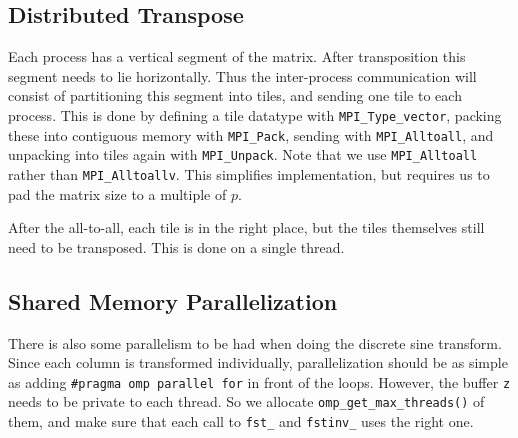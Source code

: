 \documentclass[a4paper, 12pt]{article}
\begin{document}
    \subsection{Distributed Transpose}
    Each process has a vertical segment of the matrix. After transposition this segment needs to lie horizontally. Thus the inter-process communication will consist of partitioning this segment into tiles, and sending one tile to each process. This is done by defining a tile datatype with \texttt{MPI\_Type\_vector}, packing these into contiguous memory with \texttt{MPI\_Pack}, sending with \texttt{MPI\_Alltoall}, and unpacking into tiles again with \texttt{MPI\_Unpack}. Note that we use \texttt{MPI\_Alltoall} rather than \texttt{MPI\_Alltoallv}. This simplifies implementation, but requires us to pad the matrix size to a multiple of $p$.
    
    After the all-to-all, each tile is in the right place, but the tiles themselves still need to be transposed. This is done on a single thread.
    
    \subsection{Shared Memory Parallelization}
    There is also some parallelism to be had when doing the discrete sine transform. Since each column is transformed individually, parallelization should be as simple as adding \texttt{\#pragma omp parallel for} in front of the loops. However, the buffer \texttt{z} needs to be private to each thread. So we allocate \texttt{omp\_get\_max\_threads()} of them, and make sure that each call to \texttt{fst\_} and \texttt{fstinv\_} uses the right one.
\end{document}
